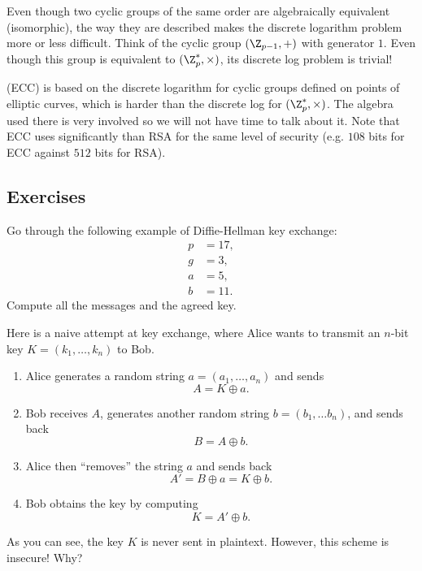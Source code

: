 \documentclass[a4paper, 11pt, openany]{book}
\begin{document}
Even though two cyclic groups of the same order are algebraically equivalent (isomorphic), the way they are described makes the discrete logarithm problem more or less difficult. Think of the cyclic group $(\Z_{p-1}, +)$ with generator $1$. Even though this group is equivalent to $(\Z_p^*, \times)$, its discrete log problem is trivial!

 (ECC) is based on the discrete logarithm for cyclic groups defined on points of elliptic curves, which is harder than the discrete log for $(\Z_p^*, \times)$. The algebra used there is very involved so we will not have time to talk about it. Note that ECC uses significantly  than RSA for the same level of security (e.g. $108$ bits for ECC against $512$ bits for RSA).

\subsection{Exercises}

\begin{exercise}
Go through the following example of Diffie-Hellman key exchange:
\begin{align*}
    p &= 17,\\
    g &= 3,\\
    a &= 5,\\
    b &= 11.
\end{align*}
Compute all the messages and the agreed key.
\end{exercise}



\begin{exercise}
Here is a naive attempt at key exchange, where Alice wants to transmit an $n$-bit key $K = (k_1, \dots, k_n)$ to Bob.
\begin{enumerate}
    \item Alice generates a random string $a = (a_1, \dots, a_n)$ and sends
    \[
        A = K \oplus a.
    \]

    \item Bob receives $A$, generates another random string $b = (b_1, \dots b_n)$, and sends back
    \[
        B = A \oplus b.
    \]

    \item Alice then ``removes'' the string $a$ and sends back
    \[
        A' = B \oplus a = K \oplus b.
    \]

    \item Bob obtains the key by computing
    \[
        K = A' \oplus b.
    \]
\end{enumerate}
As you can see, the key $K$ is never sent in plaintext. However, this scheme is insecure! Why?
\end{exercise}
\end{document}
